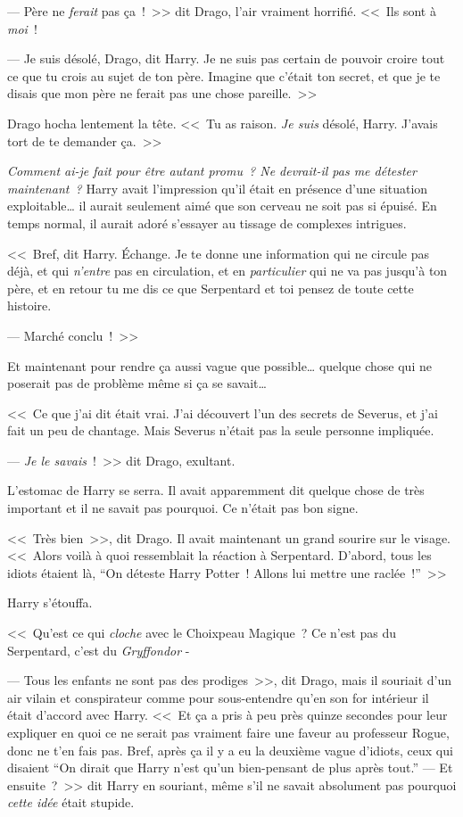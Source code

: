 --- Père ne \emph{ferait} pas ça~!~>> dit Drago, l'air vraiment horrifié. <<~Ils sont à \emph{moi}~!

--- Je suis désolé, Drago, dit Harry. Je ne suis pas certain de pouvoir croire tout ce que tu crois au sujet de ton père. Imagine que c'était ton secret, et que je te disais que mon père ne ferait pas une chose pareille.~>>

Drago hocha lentement la tête. <<~Tu as raison. \emph{Je suis} désolé, Harry. J'avais tort de te demander ça.~>>

\emph{Comment ai-je fait pour être autant promu~? Ne devrait-il pas me détester maintenant~?} Harry avait l'impression qu'il était en présence d'une situation exploitable… il aurait seulement aimé que son cerveau ne soit pas si épuisé. En temps normal, il aurait adoré s'essayer au tissage de complexes intrigues.

<<~Bref, dit Harry. Échange. Je te donne une information qui ne circule pas déjà, et qui \emph{n'entre} pas en circulation, et en \emph{particulier} qui ne va pas jusqu'à ton père, et en retour tu me dis ce que Serpentard et toi pensez de toute cette histoire.

--- Marché conclu~!~>>

Et maintenant pour rendre ça aussi vague que possible… quelque chose qui ne poserait pas de problème même si ça se savait…

<<~Ce que j'ai dit était vrai. J'ai découvert l'un des secrets de Severus, et j'ai fait un peu de chantage. Mais Severus n'était pas la seule personne impliquée.

--- \emph{Je le savais}~!~>> dit Drago, exultant.

L'estomac de Harry se serra. Il avait apparemment dit quelque chose de très important et il ne savait pas pourquoi. Ce n'était pas bon signe.

<<~Très bien~>>, dit Drago. Il avait maintenant un grand sourire sur le visage. <<~Alors voilà à quoi ressemblait la réaction à Serpentard. D'abord, tous les idiots étaient là, “On déteste Harry Potter~! Allons lui mettre une raclée~!”~>>

Harry s'étouffa.

<<~Qu'est ce qui \emph{cloche} avec le Choixpeau Magique~? Ce n'est pas du Serpentard, c'est du \emph{Gryffondor} -

--- Tous les enfants ne sont pas des prodiges~>>, dit Drago, mais il souriait d'un air vilain et conspirateur comme pour sous-entendre qu'en son for intérieur il était d'accord avec Harry. <<~Et ça a pris à peu près quinze secondes pour leur expliquer en quoi ce ne serait pas vraiment faire une faveur au professeur Rogue, donc ne t'en fais pas. Bref, après ça il y a eu la deuxième vague d'idiots, ceux qui disaient “On dirait que Harry n'est qu'un bien-pensant de plus après tout.”
--- Et ensuite~?~>> dit Harry en souriant, même s'il ne savait absolument pas pourquoi \emph{cette idée} était stupide.

